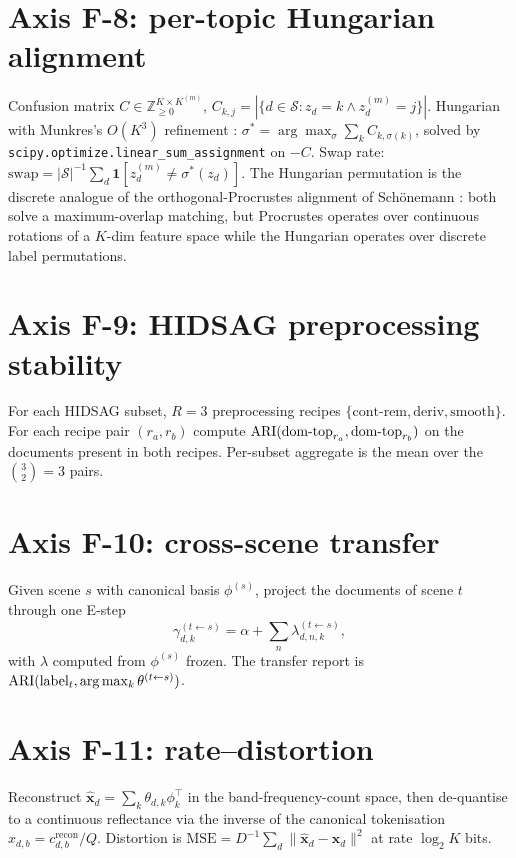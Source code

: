 \documentclass[11pt,a4paper]{article}
\begin{document}
\section{Axis F-8: per-topic Hungarian alignment}
Confusion matrix
$C \in \mathbb{Z}^{K \times K^{(m)}}_{\ge 0}$,
$C_{k, j} = |\{d \in \mathcal{S} : z_d = k \wedge z^{(m)}_d = j\}|$.
Hungarian \cite{kuhn1955hungarian} with Munkres's $O(K^3)$
refinement \cite{munkres1957algorithms}:
$\sigma^* = \arg\max_\sigma \sum_k C_{k, \sigma(k)}$,
solved by \texttt{scipy.optimize.linear\_sum\_assignment} on $-C$.
Swap rate:
$\mathrm{swap} = |\mathcal{S}|^{-1} \sum_d \mathbf{1}[z^{(m)}_d \ne
\sigma^*(z_d)]$.
The Hungarian permutation is the discrete analogue of the
orthogonal-Procrustes
alignment of Schönemann \cite{schoenemann1966procrustes}: both
solve a maximum-overlap matching, but Procrustes operates over
continuous rotations of a $K$-dim feature space while the
Hungarian operates over discrete label permutations.

\section{Axis F-9: HIDSAG preprocessing stability}
For each HIDSAG subset, $R = 3$ preprocessing recipes $\{\text{cont-rem},
\text{deriv}, \text{smooth}\}$. For each recipe pair $(r_a, r_b)$
compute $\mathrm{ARI}(\text{dom-top}_{r_a}, \text{dom-top}_{r_b})$ on the
documents present in both recipes. Per-subset aggregate is the mean
over the $\binom{3}{2} = 3$ pairs.

\section{Axis F-10: cross-scene transfer}
Given scene $s$ with canonical basis $\phi^{(s)}$, project the
documents of scene $t$ through one E-step
\begin{equation}
\gamma_{d, k}^{(t \leftarrow s)} = \alpha + \sum_n
\lambda_{d, n, k}^{(t \leftarrow s)},
\end{equation}
with $\lambda$ computed from $\phi^{(s)}$ frozen. The transfer
report is
$\mathrm{ARI}(\text{label}_t, \arg\max_k \theta^{(t \leftarrow s)})$.

\section{Axis F-11: rate--distortion}
Reconstruct
$\hat{\mathbf{x}}_d = \sum_k \theta_{d,k} \phi_k^\top$ in the
band-frequency-count space, then de-quantise to a continuous
reflectance via the inverse of the canonical tokenisation
$\hat{x}_{d,b} = c_{d,b}^{\text{recon}} / Q$. Distortion is
$\mathrm{MSE} = D^{-1} \sum_d \|\hat{\mathbf{x}}_d
- \mathbf{x}_d\|^2$ at rate $\log_2 K$ bits.
\end{document}
